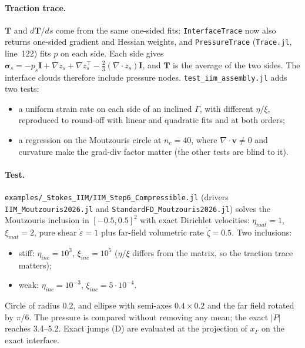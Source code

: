\documentclass[11pt,a4paper]{article}
\newcommand{\code}[1]{\texttt{#1}}
\begin{document}
\paragraph{Traction trace.} $\mathbf T$ and $d\mathbf T/ds$ come from the same one-sided fits:
\code{InterfaceTrace} now also returns one-sided gradient and Hessian weights, and
\code{PressureTrace} (\code{Trace.jl}, line~122) fits $p$ on each side. Each side gives
$\boldsymbol\sigma_s=-p_s\mathbf I+\nabla z_s+\nabla z_s^\top-\tfrac23(\nabla\cdot z_s)\mathbf I$,
and $\mathbf T$ is the average of the two sides. The interface clouds therefore include
pressure nodes. \code{test\_iim\_assembly.jl} adds two tests:
\begin{itemize}
  \item a uniform strain rate on each side of an inclined $\Gamma$, with different $\eta/\xi$,
    reproduced to round-off with linear and quadratic fits and at both orders;
  \item a regression on the Moutzouris circle at $n_c=40$, where $\nabla\cdot\mathbf v\neq0$ and
    curvature make the grad-div factor matter (the other tests are blind to it).
\end{itemize}

\paragraph{Test.} \code{examples/\_Stokes\_IIM/IIM\_Step6\_Compressible.jl} (drivers
\code{IIM\_Moutzouris2026.jl} and \code{StandardFD\_Moutzouris2026.jl}) solves the Moutzouris
inclusion in $[-0.5,0.5]^2$ with exact Dirichlet velocities: $\eta_{mat}=1$, $\xi_{mat}=2$,
pure shear $\dot\varepsilon=1$ plus far-field volumetric rate $\dot\zeta=0.5$. Two inclusions:
\begin{itemize}
  \item stiff: $\eta_{inc}=10^3$, $\xi_{inc}=10^5$ ($\eta/\xi$ differs from the matrix, so the
    traction trace matters);
  \item weak: $\eta_{inc}=10^{-3}$, $\xi_{inc}=5\cdot10^{-4}$.
\end{itemize}
Circle of radius 0.2, and ellipse with semi-axes $0.4\times0.2$ and the far field rotated by
$\pi/6$. The pressure is compared without removing any mean; the exact $|P|$ reaches 3.4--5.2.
Exact jumps (D) are evaluated at the projection of $x_\Gamma$ on the exact interface.
\end{document}
